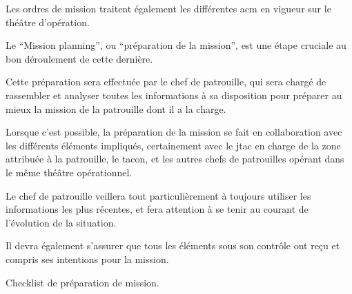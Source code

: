 Les ordres de mission traitent également les différentes \gls{acm} en vigueur sur le théâtre d'opération.

\begin{e1}
	\item Le ``Mission planning'', ou ``préparation de la mission'', est une étape cruciale au bon déroulement de cette dernière.
	\item Cette préparation sera effectuée par le chef de patrouille, qui sera chargé de rassembler et analyser toutes les informations à sa disposition pour préparer au mieux la mission de la patrouille dont il a la charge.
	\item Lorsque c'est possible, la préparation de la mission se fait en collaboration avec les différents éléments impliqués, certainement avec le \gls{jtac} en charge de la zone attribuée à la patrouille, le \gls{tacon}, et les autres chefs de patrouilles opérant dans le même théâtre opérationnel.
	\item Le chef de patrouille veillera tout particulièrement à toujours utiliser les informations les plus récentes, et fera attention à se tenir au courant de l'évolution de la situation.
	\item Il devra également s'assurer que tous les éléments sous son contrôle ont reçu et compris ses intentions pour la mission.
	\item Checklist de préparation de mission. 
\end{e1}



